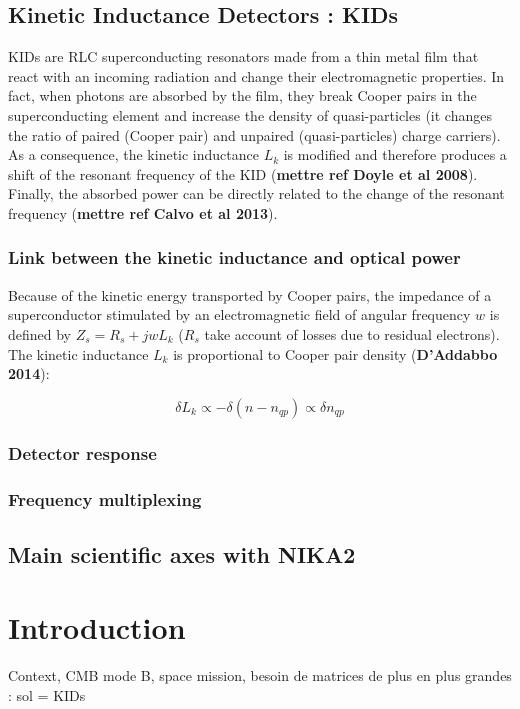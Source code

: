 \documentclass[english,11pt]{report}
\begin{document}
\section{Kinetic Inductance Detectors : KIDs}
KIDs are RLC superconducting resonators made from a thin metal film that react with an incoming radiation and change their electromagnetic properties. In fact, when photons are absorbed by the film, they break Cooper pairs in the superconducting element and increase the density of quasi-particles (it changes the ratio of paired (Cooper pair) and unpaired (quasi-particles) charge carriers). As a consequence, the kinetic inductance $L_{k}$ is modified and therefore produces a shift of the resonant frequency of the KID (\textbf{mettre ref Doyle et al 2008}). Finally, the absorbed power can be directly related to the change of  the resonant frequency (\textbf{mettre ref Calvo et al 2013}).

	\subsection{Link between the kinetic inductance and optical power}
Because of the kinetic energy transported by Cooper pairs, the impedance of a superconductor stimulated by an electromagnetic field of angular frequency $w$ is defined by $Z_{s} = R_{s} +jwL_{k}$ ($R_{s}$ take account of losses due to residual electrons).  The kinetic inductance $L_{k}$ is proportional to Cooper pair density (\textbf{D'Addabbo 2014}):

\begin{equation}
\delta L_{k} \propto -\delta(n - n_{qp}) \propto \delta n_{qp}
\end{equation}

	\subsection{Detector response}
	\subsection{Frequency multiplexing}
	
\section{Main scientific axes with NIKA2}

\chapter{Introduction}
Context, CMB mode B, space mission, besoin de matrices de plus en plus grandes : sol = KIDs 
\end{document}
